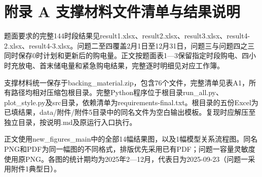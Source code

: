 \documentclass[UTF8,a4paper,zihao=-4,fontset=windows]{ctexart}
\begin{document}
\section{附录 A 支撑材料文件清单与结果说明}
题面要求的完整144时段结果见result1.xlsx、result2.xlsx、result3.xlsx、result4-2.xlsx、result4-3.xlsx。问题二至四覆盖2月1日至12月31日，问题三与问题四之三同时保存0时计划和更新后的购电量。正文按题面表1—3保留指定时段购电、四小时充放电、首末储电量和紧急购电结果，完整逐时明细见对应工作簿。
\par
支撑材料统一保存于backing\_material.zip，包含76个文件，完整清单见表A1，所有路径均相对压缩包根目录。完整Python程序位于根目录run\_all.py、plot\_style.py及src目录，依赖清单为requirements-final.txt。根目录的五份Excel为已填结果，data/附件/附件5目录中的同名文件为空白输出模板。复现时应解压至独立目录，按说明.md及原运行入口执行。
\par
正文使用new\_figures\_main中的全部14幅结果图，以及1幅模型关系流程图。同名PNG和PDF为同一幅图的不同格式，排版优先采用已有PDF；问题一容量灵敏度使用原PNG。各图的统计期均为2025年2—12月，代表日为2025-09-23（问题一采用附件1典型日）。
\par
\begingroup\fontsize{9.5}{12}\selectfont\renewcommand{\arraystretch}{1.15}
\end{document}
